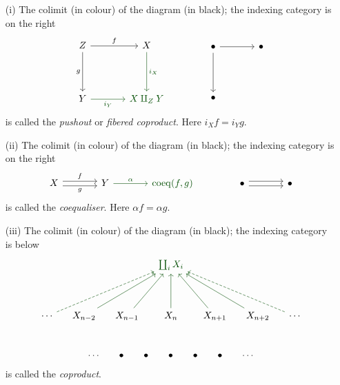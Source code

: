 \vspace*{0.1in}

\begin{example}\hfill
\begin{itemize}
\item[(i)] The colimit (in colour) of the diagram (in black); the indexing category is on the right 
\[\begin{tikzcd}[row sep=huge, column sep = large]
Z \arrow[d, "g"'] \arrow[r, "f"] & X \arrow[d, "i_X",darkgreen] \\[0.5em]
Y \arrow[r, "i_Y"',darkgreen]                                              & {\color{darkgreen}X\amalg_Z Y}               
\end{tikzcd}
\qquad\qquad
\begin{tikzcd}[row sep=huge, column sep = large]
\bullet \arrow[d] \arrow[r] & \bullet \\[0.5em]
\bullet &                
\end{tikzcd}\]
is called the \emph{pushout} or \emph{fibered coproduct}. Here $i_Xf = i_Yg$.

\item[(ii)] The colimit (in colour) of the diagram (in black); the indexing category is on the right 
\[\begin{tikzcd}[column sep=large]
X \arrow[r, "f", shift left] \arrow[r, "g"', shift right] & Y \arrow[r, "\alpha",darkgreen] & {\color{darkgreen}\mathrm{coeq}(f,g)}
\end{tikzcd}
\qquad\qquad
\begin{tikzcd}[column sep=large]
\bullet \arrow[r, shift left] \arrow[r, shift right] & \bullet
\end{tikzcd}\]
is called the \emph{coequaliser}. Here $\alpha f = \alpha g$.

\item[(iii)] The colimit (in colour) of the diagram (in black); the indexing category is below
\[\begin{tikzcd}[row sep=huge, column sep=small]
 &                     &                    & {\color{darkgreen}\coprod_iX_i} &                    &                     &                             \\
\cdots \arrow[rrru, dashed,darkgreen]        & X_{n-2} \arrow[rru,darkgreen] & X_{n-1} \arrow[ru,darkgreen] & X_{n} \arrow[u,darkgreen]            & X_{n+1} \arrow[lu,darkgreen] & X_{n+2} \arrow[llu,darkgreen] & \cdots \arrow[lllu, dashed,darkgreen]
\end{tikzcd}\]\\[-0.5em]
\[\begin{tikzcd}[row sep=huge, column sep=small]
\cdots & \bullet & \bullet & \bullet & \bullet & \bullet & \cdots
\end{tikzcd}\]
is called the \emph{coproduct}.


\end{itemize}
\end{example}
